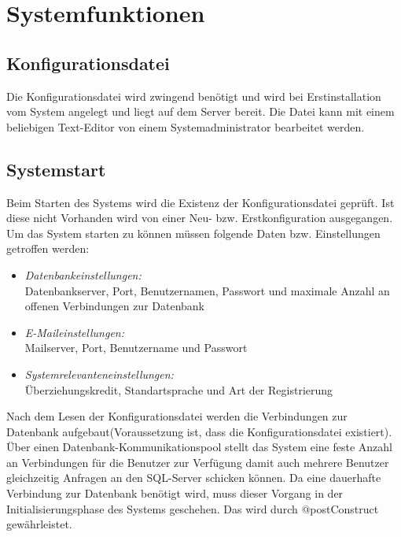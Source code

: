 \chapter{Systemfunktionen}

\section{Konfigurationsdatei}
	
		Die Konfigurationsdatei wird zwingend benötigt und wird bei Erstinstallation vom System angelegt und liegt auf dem Server bereit. Die Datei kann mit einem beliebigen Text-Editor von einem Systemadministrator bearbeitet werden.
	

\section{Systemstart}
		Beim Starten des Systems wird die Existenz der Konfigurationsdatei geprüft. Ist diese nicht Vorhanden wird von einer Neu- bzw. Erstkonfiguration ausgegangen. Um das System starten zu können müssen folgende Daten bzw. Einstellungen getroffen werden:
		\begin{itemize}
			\item \emph{Datenbankeinstellungen:}\\
			 Datenbankserver, Port, Benutzernamen, Passwort und maximale Anzahl an offenen Verbindungen zur Datenbank
			\item \emph{E-Maileinstellungen:}\\
			 Mailserver, Port, Benutzername und Passwort
			\item \emph{Systemrelevanteneinstellungen:}\\
			 Überziehungskredit, Standartsprache und Art der Registrierung
		\end{itemize}
		Nach dem Lesen der Konfigurationsdatei werden die Verbindungen zur Datenbank aufgebaut(Voraussetzung ist, dass die Konfigurationsdatei existiert). Über einen Datenbank-Kommunikationspool stellt das System eine feste Anzahl an Verbindungen für die Benutzer zur Verfügung damit auch mehrere Benutzer gleichzeitig Anfragen an den SQL-Server schicken können. Da eine dauerhafte Verbindung zur Datenbank benötigt wird, muss dieser Vorgang in der Initialisierungsphase des Systems geschehen. Das wird durch @postConstruct gewährleistet. 
	
